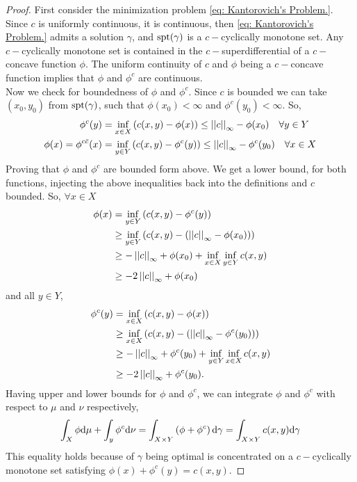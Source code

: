 \begin{proof}
First consider the minimization problem \eqref{eq: Kantorovich's Problem.}. Since $c$ is uniformly continuous, it is continuous, then \eqref{eq: Kantorovich's Problem.} admits a solution $\gamma$, and $\mathrm{spt}(\gamma)$ is a $c-$cyclically monotone set. Any $c-$cyclically monotone set is contained in the $c-$superdifferential of a $c-$concave function $\phi$. The uniform continuity of $c$ and $\phi$ being a $c-$concave function implies that $\phi$ and $\phi^c$ are continuous. \\

Now we check for boundedness of $\phi$ and $\phi^c$. Since $c$ is bounded we can take $(x_0, y_0)$ from $\mathrm{spt}(\gamma)$, such that $\phi(x_0)<\infty$ and $\phi^c(y_0)<\infty$. So, \begin{align*}
\phi^{c}(y)&=\inf_{x\in X}\left( c(x,y)-\phi(x) \right)\leq \left|\left|c\right|\right|_{\infty}-\phi(x_0) \quad \forall y\in Y\\
\phi(x)=\phi^{c\bar c}(x)&=\inf_{y\in Y}\left( c(x,y)-\phi^c(y) \right)\leq\left|\left|c\right|\right|_{\infty}-\phi^c(y_0) \quad \forall x\in X
\end{align*}
Proving that $\phi$ and $\phi^c$ are bounded form above. We get a lower bound, for both functions, injecting the above inequalities back into the definitions and $c$ bounded. So, $\forall x\in X$
\begin{align*}
\phi(x)&=\inf_{y\in Y}\left( c(x,y)-\phi^c(y) \right)\\
&\geq\inf_{y\in Y}\left( c(x,y)-\left( \left|\left|c\right|\right|_\infty-\phi(x_0) \right) \right)\\
&\geq -\left|\left|c\right|\right|_{\infty}+\phi(x_0)+\inf_{x\in X}\inf_{y\in Y} c(x,y)\\
&\geq -2\left|\left|c\right|\right|_{\infty}+\phi(x_0)
\end{align*}
and all $y\in Y$,
\begin{align*}
\phi^c(y)&=\inf_{x\in X}\left( c(x,y)-\phi(x) \right)\\
&\geq\inf_{x\in X}\left( c(x,y)-\left( \left|\left|c\right|\right|_\infty-\phi^c(y_0) \right) \right)\\
&\geq -\left|\left|c\right|\right|_{\infty}+\phi^c(y_0)+\inf_{y\in Y}\inf_{x\in X} c(x,y)\\
&\geq -2\left|\left|c\right|\right|_{\infty}+\phi^c(y_0).
\end{align*}
Having upper and lower bounds for $\phi$ and $\phi^c$, we can integrate $\phi$ and $\phi^c$ with respect to $\mu$ and $\nu$ respectively,
\begin{equation*}
	\int_X \phi \mathrm{d}\mu +\int_y \phi^c\mathrm{d}\nu=\int_{X\times Y}\left( \phi+\phi^c \right)\mathrm{d}\gamma=\int_{X\times Y}c(x,y)\mathrm{d} \gamma
\end{equation*} 
This equality holds because of $\gamma$ being optimal is concentrated on a $c-$cyclically monotone set satisfying $\phi(x)+\phi^c(y)=c(x,y)$.


\end{proof}
